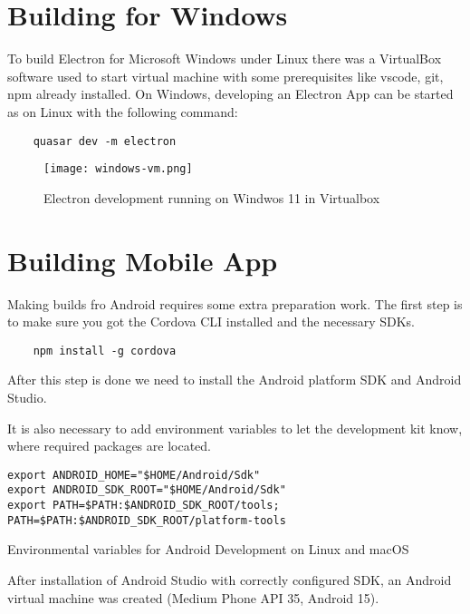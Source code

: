 \section{{Building for Windows}}%
\label{sec:windows}

To build Electron for Microsoft Windows under Linux there was a VirtualBox \autocite{VBox} software used to start virtual machine with some prerequisites like vscode, git, npm already installed. On Windows, developing an Electron App can be started as on Linux with the following command:

\begin{verbatim}
    quasar dev -m electron
\end{verbatim}


\begin{figure}[H]
    \centering
    \texttt{[image: windows-vm.png]}
    \caption[Electron on Windows virtual machine]{\label{fig:windowsvbox} Electron development running on Windwos 11 in Virtualbox }
\end{figure}


\section{{Building Mobile App}}%
\label{sec:mobile}

Making builds fro Android requires some extra preparation work. The first step is to make sure you got the Cordova CLI installed and the necessary SDKs.
\begin{verbatim}
    npm install -g cordova
\end{verbatim}

After this step is done we need to install the Android platform SDK and Android Studio.  

It is also necessary to add environment variables to let the development kit know, where required packages are located.

\begin{listing}[H]
    \begin{verbatim}
export ANDROID_HOME="$HOME/Android/Sdk"
export ANDROID_SDK_ROOT="$HOME/Android/Sdk"
export PATH=$PATH:$ANDROID_SDK_ROOT/tools; PATH=$PATH:$ANDROID_SDK_ROOT/platform-tools
    \end{verbatim}
\caption[Environmental variables for Android SDK on Linux and macOS]{Environmental variables for Android Development on Linux and macOS}
\end{listing}

After installation of Android Studio with correctly configured SDK, an Android virtual machine was created (Medium Phone API 35, Android 15).

